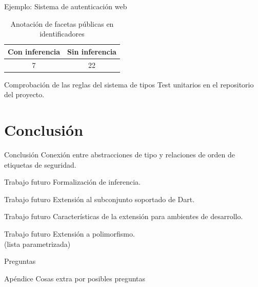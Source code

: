 \documentclass[aspectratio=169,10pt]{beamer}
\begin{document}
\begin{frame}[fragile]{Ejemplo: Sistema de autenticación web}
	\begin{table}
		\caption{Anotación de facetas públicas en identificadores}
		\begin{tabular}{c|c}
			Con inferencia & Sin inferencia\\
			\hline
			7 & 22\\
		\end{tabular}
	\end{table}
\end{frame}

\begin{frame}[fragile]{Comprobación de las reglas del sistema de tipos}
	Test unitarios en el repositorio del proyecto.
\end{frame}

\section{Conclusión}

\begin{frame}[fragile]{Conclusión}
	Conexión entre abstracciones de tipo y relaciones de orden de etiquetas de seguridad.
\end{frame}

\begin{frame}[fragile]{Trabajo futuro}
	Formalización de inferencia.
\end{frame}

\begin{frame}[fragile]{Trabajo futuro}
	Extensión al subconjunto soportado de Dart.
\end{frame}

\begin{frame}[fragile]{Trabajo futuro}
	Características de la extensión para ambientes de desarrollo.
\end{frame}

\begin{frame}[fragile]{Trabajo futuro}
	Extensión a polimorfismo. \\ \pause
	(lista parametrizada)
\end{frame}


{
\begin{frame}[standout]
  Preguntas
\end{frame}
}

\appendix

\begin{frame}[fragile]{Apéndice}
  Cosas extra por posibles preguntas
\end{frame}
\end{document}
